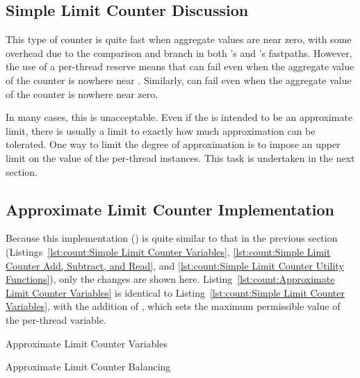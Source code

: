 \subsection{Simple Limit Counter Discussion}
\label{sec:count:Simple Limit Counter Discussion}

This type of counter is quite fast when aggregate values are near zero,
with some overhead due to the comparison and branch in both
's and 's fastpaths.
However, the use of a per-thread  reserve means that
 can fail even when
the aggregate value of the counter is nowhere near .
Similarly,  can fail
even when the aggregate value of the counter is nowhere near zero.

In many cases, this is unacceptable.
Even if the  is intended to be an approximate limit,
there is usually a limit to exactly how much approximation can be tolerated.
One way to limit the degree of approximation is to impose an upper limit
on the value of the per-thread  instances.
This task is undertaken in the next section.

\subsection{Approximate Limit Counter Implementation}
\label{sec:count:Approximate Limit Counter Implementation}

Because this implementation () is quite similar to
that in the previous section
(Listings~\ref{lst:count:Simple Limit Counter Variables},
\ref{lst:count:Simple Limit Counter Add, Subtract, and Read}, and
\ref{lst:count:Simple Limit Counter Utility Functions}),
only the changes are shown here.
Listing~\ref{lst:count:Approximate Limit Counter Variables}
is identical to
Listing~\ref{lst:count:Simple Limit Counter Variables},
with the addition of , which sets the maximum
permissible value of the per-thread  variable.

\begin{listing}[tbp]

\caption{Approximate Limit Counter Variables}
\label{lst:count:Approximate Limit Counter Variables}
\end{listing}

\begin{listing}[tbp]

\caption{Approximate Limit Counter Balancing}
\label{lst:count:Approximate Limit Counter Balancing}
\end{listing}

